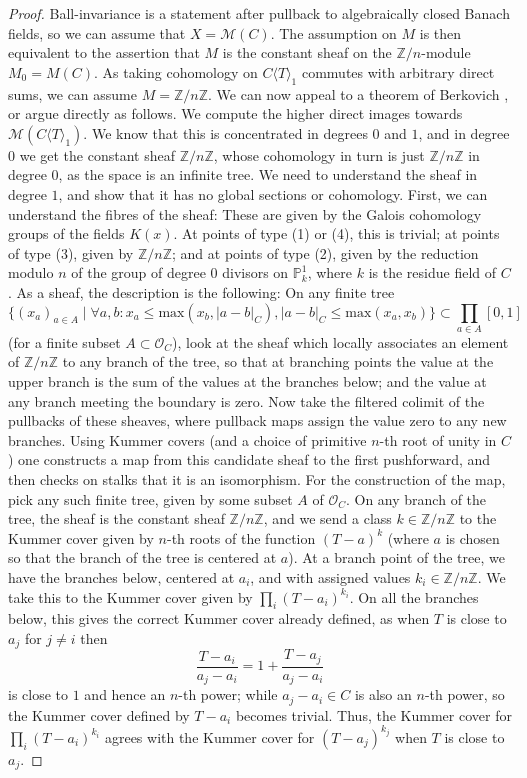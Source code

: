 \documentclass[11pt]{amsart}
\numberwithin{equation}{section}
\numberwithin{theorem}{section}
\theoremstyle{definition}
\begin{document}
\begin{proof} Ball-invariance is a statement after pullback to algebraically closed Banach fields, so we can assume that $X=\mathcal M(C)$. The assumption on $M$ is then equivalent to the assertion that $M$ is the constant sheaf on the $\mathbb Z/n$-module $M_0=M(C)$. As taking cohomology on $C\langle T\rangle_1$ commutes with arbitrary direct sums, we can assume $M=\mathbb Z/n\mathbb Z$. We can now appeal to a theorem of Berkovich \cite[Theorems 6.3.9, 6.4.1]{BerkovichEtale}, or argue directly as follows. We compute the higher direct images towards $\mathcal M(C\langle T\rangle_1)$. We know that this is concentrated in degrees $0$ and $1$, and in degree $0$ we get the constant sheaf $\mathbb Z/n\mathbb Z$, whose cohomology in turn is just $\mathbb Z/n\mathbb Z$ in degree $0$, as the space is an infinite tree. We need to understand the sheaf in degree $1$, and show that it has no global sections or cohomology. First, we can understand the fibres of the sheaf: These are given by the Galois cohomology groups of the fields $K(x)$. At points of type (1) or (4), this is trivial; at points of type (3), given by $\mathbb Z/n\mathbb Z$; and at points of type (2), given by the reduction modulo $n$ of the group of degree $0$ divisors on $\mathbb P^1_k$, where $k$ is the residue field of $C$. As a sheaf, the description is the following: On any finite tree
\[
\{(x_a)_{a\in A}\mid \forall a,b: x_a\leq \mathrm{max}(x_b,|a-b|_C), |a-b|_C\leq \mathrm{max}(x_a,x_b)\}\subset \prod_{a\in A} [0,1]
\]
(for a finite subset $A\subset \mathcal O_C$), look at the sheaf which locally associates an element of $\mathbb Z/n\mathbb Z$ to any branch of the tree, so that at branching points the value at the upper branch is the sum of the values at the branches below; and the value at any branch meeting the boundary is zero. Now take the filtered colimit of the pullbacks of these sheaves, where pullback maps assign the value zero to any new branches. Using Kummer covers (and a choice of primitive $n$-th root of unity in $C$) one constructs a map from this candidate sheaf to the first pushforward, and then checks on stalks that it is an isomorphism. For the construction of the map, pick any such finite tree, given by some subset $A$ of $\mathcal O_C$. On any branch of the tree, the sheaf is the constant sheaf $\mathbb Z/n\mathbb Z$, and we send a class $k\in \mathbb Z/n\mathbb Z$ to the Kummer cover given by $n$-th roots of the function $(T-a)^k$ (where $a$ is chosen so that the branch of the tree is centered at $a$). At a branch point of the tree, we have the branches below, centered at $a_i$, and with assigned values $k_i\in \mathbb Z/n\mathbb Z$. We take this to the Kummer cover given by $\prod_i (T-a_i)^{k_i}$. On all the branches below, this gives the correct Kummer cover already defined, as when $T$ is close to $a_j$ for $j\neq i$ then
\[
\frac{T-a_i}{a_j-a_i} = 1 + \frac{T-a_j}{a_j-a_i}
\]
is close to $1$ and hence an $n$-th power; while $a_j-a_i\in C$ is also an $n$-th power, so the Kummer cover defined by $T-a_i$ becomes trivial. Thus, the Kummer cover for $\prod_i (T-a_i)^{k_i}$ agrees with the Kummer cover for $(T-a_j)^{k_j}$ when $T$ is close to $a_j$.


\end{proof}
\end{document}
